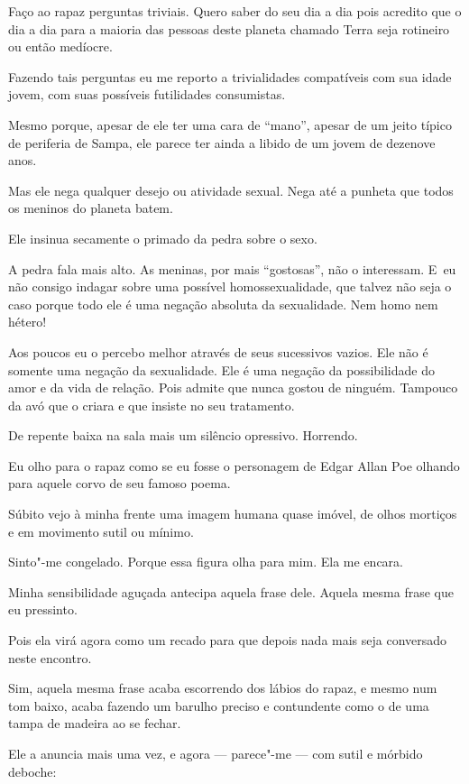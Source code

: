 \asterisc{}

Faço ao rapaz perguntas triviais. Quero saber do seu dia a dia pois
acredito que o dia a dia para a maioria das pessoas deste planeta
chamado Terra seja rotineiro ou então medíocre.

Fazendo tais perguntas eu me reporto a trivialidades compatíveis com sua
idade jovem, com suas possíveis futilidades consumistas.

Mesmo porque, apesar de ele ter uma cara de ``mano'', apesar de um jeito
típico de periferia  de Sampa, ele parece ter ainda a libido de um
jovem de dezenove anos.

Mas ele nega qualquer desejo ou atividade sexual. Nega até a punheta que
todos os meninos do planeta batem.

Ele insinua secamente o primado da pedra sobre o sexo.

A pedra fala mais alto. As meninas, por mais ``gostosas'', não o
interessam. E~eu não consigo indagar sobre uma possível
homossexualidade, que talvez não seja o caso porque todo ele é uma
negação absoluta da sexualidade. Nem homo nem hétero!

Aos poucos eu o percebo melhor através de seus sucessivos vazios. Ele
não é somente uma negação da sexualidade. Ele é uma negação da
possibilidade do amor e da vida de relação. Pois admite que nunca gostou
de ninguém. Tampouco da avó que o criara e que insiste no seu
tratamento.

\asterisc{}

De repente baixa na sala mais um silêncio opressivo. Horrendo.

Eu olho para o rapaz como se eu fosse o personagem de Edgar Allan Poe
olhando para aquele corvo de seu famoso poema.

Súbito vejo à minha frente uma imagem humana quase imóvel, de olhos
mortiços e em movimento sutil ou mínimo.

Sinto"-me congelado. Porque essa figura olha para mim. Ela me encara.

Minha sensibilidade aguçada antecipa aquela frase dele. Aquela mesma
frase que eu pressinto.

Pois ela virá agora como um recado para que depois nada mais seja
conversado neste encontro.

Sim, aquela mesma frase acaba escorrendo dos lábios do rapaz, e mesmo
num tom baixo, acaba fazendo um barulho preciso e contundente como o de
uma tampa de madeira ao se fechar.

Ele a anuncia mais uma vez, e agora --- parece"-me --- com sutil e
mórbido deboche:

